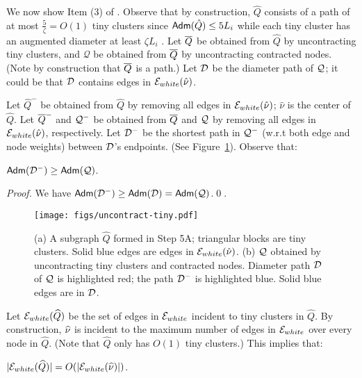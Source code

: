 We now show Item (3) of .  Observe that by construction, $\widehat{Q}$ consists of a path of at most $\frac{5}{\zeta} = O(1)$ tiny clusters since $\mathsf{Adm}(\hat{Q})\leq 5L_i$ while each tiny cluster has an augmented diameter at least $\zeta L_i$ . Let $\overline{Q}$ be obtained from $\widehat{Q}$  by uncontracting tiny clusters, and $\mathcal{Q}$ be obtained from $\overline{Q}$ by uncontracting contracted nodes. (Note by construction that $\overline{Q}$  is a path.) Let $\mathcal{D}$ be the diameter path of $\mathcal{Q}$; it could be that $\mathcal{D}$ contains edges in $\mathcal{E}_{white}(\hat{\nu})$.


Let $\widehat{Q}^-$ be obtained from $\widehat{Q}$ by removing all edges in $\mathcal{E}_{white}(\hat{\nu})$; $\hat{\nu}$ is the center of $\widehat{Q}$. Let $\overline{Q}^{-}$ and $\mathcal{Q}^-$ be obtained from $\overline{Q}$ and $\mathcal{Q}$ by removing all edges in $\mathcal{E}_{white}(\hat{\nu})$, respectively.  Let $\mathcal{D}^-$ be the shortest path in $\mathcal{Q}^-$ (w.r.t both edge and node weights) between $\mathcal{D}$'s endpoints. (See Figure~\ref{fig:uncontract-tiny}).  Observe that:


\begin{observation}\label{obs:Dminus-vs-AdmX}
	$\mathsf{Adm}(\mathcal{D}^-)\geq \mathsf{Adm}(\mathcal{Q})$.
\end{observation}
\begin{proof}
	We have $\mathsf{Adm}(\mathcal{D}^-) \geq \mathsf{Adm}(\mathcal{D}) = \mathsf{Adm}(\mathcal{Q})$.\qed.
\end{proof}
\begin{figure}[!ht]
	\centering
	\texttt{[image: figs/uncontract-tiny.pdf]}
	\caption{\footnotesize{(a) A subgraph $\widehat{Q}$ formed in Step 5A; triangular blocks are tiny clusters. Solid blue edges are edges in $\mathcal{E}_{white}(\hat{\nu})$. (b) $\mathcal{Q}$ obtained by uncontracting tiny clusters and  contracted nodes. Diameter path $\mathcal{D}$ of $\mathcal{Q}$ is highlighted red; the path $\mathcal{D}^{-}$ is highlighted blue. Solid blue edges are in $\mathcal{D}$.}}
	\label{fig:uncontract-tiny}
\end{figure}


Let 	$\mathcal{E}_{white}({\widehat{Q}})$ be the set of edges in $\mathcal{E}_{white}$ incident to tiny clusters in $\widehat{Q}$.  By construction, $\widehat{\nu}$ is incident to the maximum number of edges in $ \mathcal{E}_{white}$ over every node in $\widehat{Q}$. (Note that $\widehat{Q}$ only has $O(1)$ tiny clusters.) This implies that:

\begin{observation}\label{obs:Incident-tiny}
	$|\mathcal{E}_{white}({\widehat{Q}})| = O(| \mathcal{E}_{white}(\widehat{\nu})|)$.
\end{observation}

